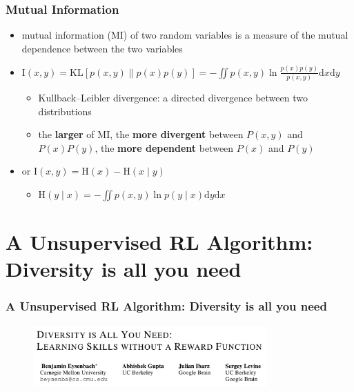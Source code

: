 \documentclass[aspectratio=169]{beamer}
\begin{document}
\begin{frame}
  \frametitle{Mutual Information}
  \begin{itemize}
    \item mutual information (MI) of two random variables is a measure of the mutual dependence between the two variables
    \item $\mathrm{I}(x, y)= \mathrm{KL}[p(x, y) \| p(x) p(y)]
      =-\iint p(x, y) \ln \frac{p(x) p(y)}{p(x, y)} \mathrm{d} x \mathrm{d} y$
      \begin{itemize}
        \item Kullback–Leibler divergence: a directed divergence between two distributions
        \item the \textbf{larger} of MI, the \textbf{more divergent} between $P(x,y)$ and $P(x)P(y)$, the \textbf{more dependent} between $P(x)$ and $P(y)$
      \end{itemize}
    \item or $\mathrm{I}(x, y)=\mathrm{H}(x)-\mathrm{H}(x \mid y)$
    \begin{itemize}
      \item $\mathrm{H}(y \mid x)=-\iint p(x, y) \ln p(y \mid x) \mathrm{d} y \mathrm{d} x$
    \end{itemize}
  \end{itemize}
\end{frame}


\section{A Unsupervised RL Algorithm: Diversity is all you need}

\begin{frame}
  \frametitle{A Unsupervised RL Algorithm: Diversity is all you need}
  \begin{figure}
    \includegraphics[width=0.8\textwidth]{imgs/DIAYN_tittle.png}
  \end{figure}
\end{frame}
\end{document}
